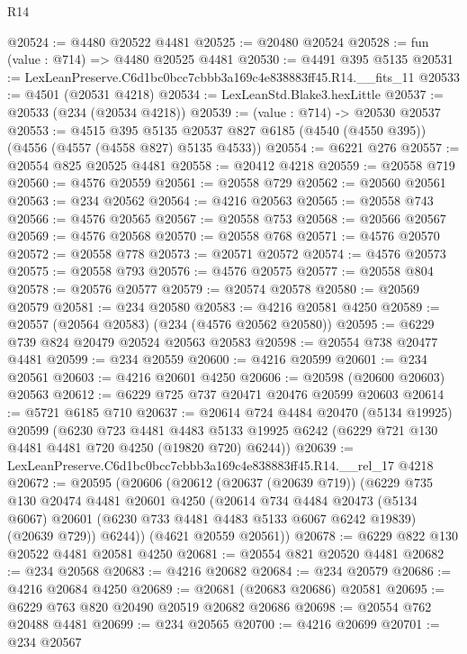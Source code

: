 \begin{lexlean}{R14}
\begin{coremodule}
@20524 := @4480 @20522 @4481
@20525 := @20480 @20524
@20528 := fun (value : @714) => @4480 @20525 @4481
@20530 := @4491 @395 @5135
@20531 := LexLeanPreserve.C6d1bc0bcc7cbbb3a169c4e838883ff45.R14.__fits_11
@20533 := @4501 (@20531 @4218)
@20534 := LexLeanStd.Blake3.hexLittle
@20537 := @20533 (@234 (@20534 @4218))
@20539 := (value : @714) -> @20530 @20537
@20553 := @4515
    @395
    @5135
    @20537
    @827
    @6185
    (@4540 (@4550 @395))
    (@4556 (@4557 (@4558 @827) @5135 @4533))
@20554 := @6221 @276
@20557 := @20554 @825 @20525 @4481
@20558 := @20412 @4218
@20559 := @20558 @719
@20560 := @4576 @20559
@20561 := @20558 @729
@20562 := @20560 @20561
@20563 := @234 @20562
@20564 := @4216 @20563
@20565 := @20558 @743
@20566 := @4576 @20565
@20567 := @20558 @753
@20568 := @20566 @20567
@20569 := @4576 @20568
@20570 := @20558 @768
@20571 := @4576 @20570
@20572 := @20558 @778
@20573 := @20571 @20572
@20574 := @4576 @20573
@20575 := @20558 @793
@20576 := @4576 @20575
@20577 := @20558 @804
@20578 := @20576 @20577
@20579 := @20574 @20578
@20580 := @20569 @20579
@20581 := @234 @20580
@20583 := @4216 @20581 @4250
@20589 := @20557 (@20564 @20583) (@234 (@4576 @20562 @20580))
@20595 := @6229 @739 @824 @20479 @20524 @20563 @20583
@20598 := @20554 @738 @20477 @4481
@20599 := @234 @20559
@20600 := @4216 @20599
@20601 := @234 @20561
@20603 := @4216 @20601 @4250
@20606 := @20598 (@20600 @20603) @20563
@20612 := @6229 @725 @737 @20471 @20476 @20599 @20603
@20614 := @5721 @6185 @710
@20637 := @20614
    @724
    @4484
    @20470
    (@5134 @19925)
    @20599
    (@6230
      @723
      @4481
      @4483
      @5133
      @19925
      @6242
      (@6229 @721 @130 @4481 @4481 @720 @4250 (@19820 @720) @6244))
@20639 := LexLeanPreserve.C6d1bc0bcc7cbbb3a169c4e838883ff45.R14.__rel_17 @4218
@20672 := @20595
    (@20606
      (@20612
        (@20637 (@20639 @719))
        (@6229
          @735
          @130
          @20474
          @4481
          @20601
          @4250
          (@20614
            @734
            @4484
            @20473
            (@5134 @6067)
            @20601
            (@6230 @733 @4481 @4483 @5133 @6067 @6242 @19839)
            (@20639 @729))
          @6244))
      (@4621 @20559 @20561))
@20678 := @6229 @822 @130 @20522 @4481 @20581 @4250
@20681 := @20554 @821 @20520 @4481
@20682 := @234 @20568
@20683 := @4216 @20682
@20684 := @234 @20579
@20686 := @4216 @20684 @4250
@20689 := @20681 (@20683 @20686) @20581
@20695 := @6229 @763 @820 @20490 @20519 @20682 @20686
@20698 := @20554 @762 @20488 @4481
@20699 := @234 @20565
@20700 := @4216 @20699
@20701 := @234 @20567

\end{coremodule}
\end{lexlean}
